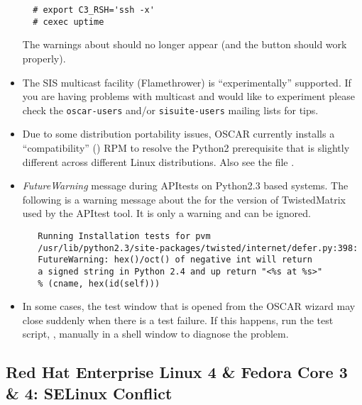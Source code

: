 \begin{itemize}
\begin{verbatim}
  # export C3_RSH='ssh -x'
  # cexec uptime
\end{verbatim}

  The warnings about  should no longer appear (and the
   button should work properly).

\item The SIS multicast facility (Flamethrower) is ``experimentally''
  supported.  If you are having problems with multicast and would like
  to experiment please check the {\tt oscar-users} and/or
  {\tt sisuite-users} mailing lists for tips.

\item Due to some distribution portability issues, OSCAR currently installs
  a ``compatibility''  () RPM to resolve the
  Python2 prerequisite that is slightly different across different Linux
  distributions.  Also see the file .

\item \emph{FutureWarning} message during APItests on Python2.3 based systems.
   The following is a warning message about the for the version of
   TwistedMatrix used by the APItest tool.  It is only a warning and can be
   ignored.
   \begin{small}
   \begin{verbatim}
   Running Installation tests for pvm
   /usr/lib/python2.3/site-packages/twisted/internet/defer.py:398:
   FutureWarning: hex()/oct() of negative int will return
   a signed string in Python 2.4 and up return "<%s at %s>" 
   % (cname, hex(id(self)))
   \end{verbatim}
   \end{small}

\item In some cases, the test window that is opened from the
  OSCAR wizard may close suddenly when there is a test failure. If
  this happens, run the test script, ,
  manually in a shell window to diagnose the problem.

\end{itemize}


\subsection{Red Hat Enterprise Linux 4 \& Fedora Core 3 \& 4: SELinux Conflict }
\label{subsec:SELinuxnotes}

